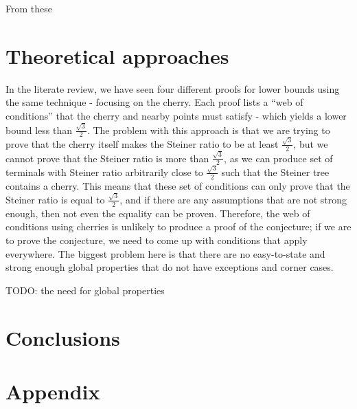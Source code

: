 \documentclass{mpaper}
\begin{document}
From these


\section{Theoretical approaches}

In the literate review, we have seen four different proofs for lower bounds using the same technique - focusing on the cherry. Each proof lists a ``web of conditions'' that the cherry and nearby points must satisfy - which yields a lower bound less than $\frac{\sqrt{3}}{2}$. The problem with this approach is that we are trying to prove that the cherry itself makes the Steiner ratio to be at least $\frac{\sqrt{3}}{2}$, but we cannot prove that the Steiner ratio is more than  $\frac{\sqrt{3}}{2}$, as we can produce set of terminals with Steiner ratio arbitrarily close to $\frac{\sqrt{3}}{2}$ such that the Steiner tree contains a cherry. This means that  these set of conditions can only prove that the Steiner ratio is equal to  $\frac{\sqrt{3}}{2}$, and if there are any assumptions that are not strong enough, then not even the equality can be proven. Therefore, the web of conditions using cherries is unlikely to produce a proof of the conjecture; if we are to prove the conjecture, we need to come up with conditions that apply everywhere. The biggest problem here is that there are no easy-to-state and strong enough global properties that do not have exceptions and corner cases.


TODO: the need for global properties

\section{Conclusions}






\section{Appendix}
\end{document}

